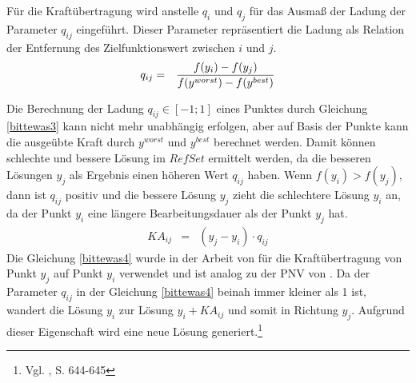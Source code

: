 \documentclass[a4paper,12pt,normalheadings,footexclude,headinclude,liststotoc,nochapterprefix,onecolumn,oneside,parskip,pointlessnumbers]{scrreprt}
\begin{document}
Für die Kraftübertragung wird anstelle $q_{i}$ und $q_{j}$ für das Ausmaß der Ladung der Parameter $q_{ij}$ eingeführt. Dieser Parameter repräsentiert die Ladung als Relation der Entfernung des Zielfunktionswert zwischen $i$ und $j$.
\begin{eqnarray} \label{bittewas3}
q_{ij} & = & \frac{f(y_{i})-f(y_{j})}{f(y^{worst})-f(y^{best})} \hfill 
\end{eqnarray}

Die Berechnung der Ladung $q_{ij} \in [-1;1]$ eines Punktes durch Gleichung \eqref{bittewas3} kann nicht mehr unabhängig erfolgen, aber auf Basis der Punkte kann die ausgeübte Kraft durch $y^{worst}$ und $y^{best}$ berechnet werden. Damit können schlechte und bessere Lösung im $RefSet$ ermittelt werden, da die besseren Lösungen $y_{j}$ als Ergebnis einen höheren Wert $q_{ij}$ haben. Wenn $f(y_{i})>f(y_{j})$, dann ist $q_{ij}$ positiv und die bessere Lösung $y_{j}$ zieht die schlechtere Lösung $y_{i}$ an, da der Punkt $y_{i}$ eine längere Bearbeitungsdauer als der Punkt $y_{j}$ hat.
\begin{eqnarray} \label{bittewas4}
KA_{ij} & = &  (y_{j} - y_{i})\cdot q_{ij}
\end{eqnarray}
Die Gleichung \eqref{bittewas4} wurde in der Arbeit von \cite{debels2006hybrid} für die Kraftübertragung von Punkt $y_{j}$ auf Punkt $y_{i}$ verwendet und ist analog zu der PNV von \cite{glover2000fundamentals}. Da der Parameter $q_{ij}$ in der Gleichung \eqref{bittewas4} beinah immer kleiner als 1 ist, wandert die Lösung $y_{i}$ zur Lösung $y_{i} + KA_{ij}$ und somit in Richtung $y_{j}$. Aufgrund dieser Eigenschaft wird eine neue Lösung generiert.\footnote{Vgl. \cite{debels2006hybrid}, S. 644-645\label{debels5}}
\end{document}
